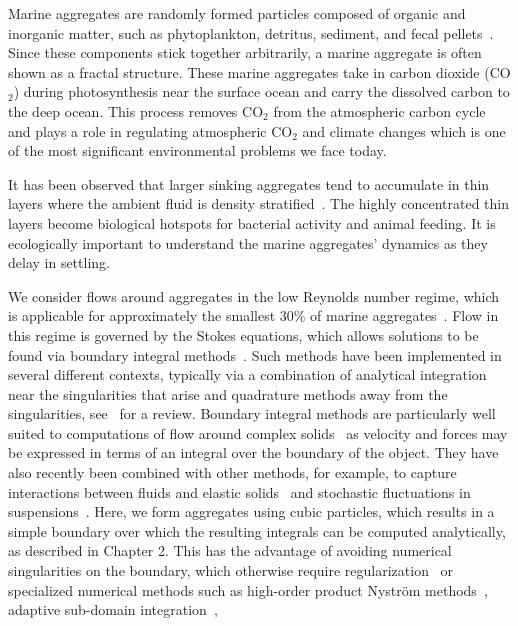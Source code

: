 Marine aggregates are randomly formed particles composed of organic and inorganic matter, such as phytoplankton, detritus, sediment, and fecal pellets~\cite{jackson_simulation_1989}. Since these components stick together arbitrarily, a marine aggregate is often shown as a fractal structure. 
These marine aggregates take in carbon dioxide (CO$_2$) during photosynthesis near the surface ocean and carry the dissolved carbon to the deep ocean. 
This process removes CO$_2$ from the atmospheric carbon cycle~\cite{honjo_understanding_2014} and plays a role in regulating atmospheric CO$_2$ and climate changes which is one of the most significant environmental problems we face today. 
 \par
 It has been observed that larger sinking aggregates tend to accumulate in thin layers where the ambient fluid is density stratified~\cite{alldredge_occurrence_2002}. The highly concentrated thin layers become biological hotspots for bacterial activity and animal feeding. It is ecologically important to understand the marine aggregates' dynamics as they delay in settling.
\par
We consider flows around aggregates in the low Reynolds number regime, which is applicable for approximately the smallest 30\% of marine aggregates~\cite{alldredge_situ_1988}. Flow in this regime is governed by the Stokes equations, which allows solutions to be found via boundary integral methods~\cite{pozrikidis_boundary_1992}. Such methods have been implemented in several different contexts, typically via a combination of analytical integration near the singularities that arise and quadrature methods away from the singularities, see~\cite{pozrikidis_boundary_1992} for a review. Boundary integral methods
are particularly well suited to computations of flow around complex solids~\cite{zinchenko_boundary-integral_2006}  as velocity and forces may be expressed in terms of an integral over the boundary of the object. 
They have also recently been combined with other methods, for example, to capture interactions between fluids and elastic solids~\cite{bao_immersed_2017} and stochastic fluctuations in suspensions~\cite{bao_fluctuating_2018}.
Here, we form aggregates using cubic particles, which results in a simple boundary over which the resulting integrals can be computed analytically, as described in Chapter 2.
This has the advantage of avoiding numerical singularities on the boundary, which otherwise require regularization~\cite{cortez_method_2001} or specialized numerical methods such as high-order product Nystr\"{o}m methods~\cite{atkinson_numerical_1997, delves_computational_1985}, adaptive sub-domain integration~\cite{chan_second-order_1992},
